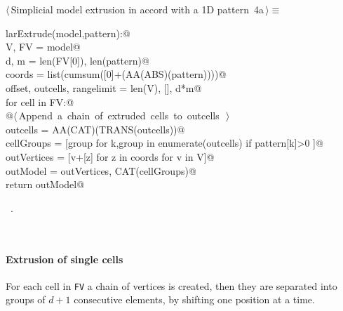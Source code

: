 \documentclass[11pt,oneside]{article}	%
\begin{document}
\begin{flushleft} \small
\begin{minipage}{\linewidth} \label{scrap1}
\protect{}$\langle\,$Simplicial model extrusion in accord with a 1D pattern\nobreak\ {\footnotesize 4a}$\,\rangle\equiv$
\vspace{-1ex}
\begin{list}{}{} \item
\mbox{}\verb@def larExtrude(model,pattern):@\\
\mbox{}\verb@    V, FV = model@\\
\mbox{}\verb@    d, m = len(FV[0]), len(pattern)@\\
\mbox{}\verb@    coords = list(cumsum([0]+(AA(ABS)(pattern))))@\\
\mbox{}\verb@    offset, outcells, rangelimit = len(V), [], d*m@\\
\mbox{}\verb@    for cell in FV:@\\
\mbox{}\verb@        @\hbox{$\langle\,$Append a chain of extruded cells to outcells\nobreak\ {\footnotesize {}}$\,\rangle$}\verb@@\\
\mbox{}\verb@    outcells = AA(CAT)(TRANS(outcells))@\\
\mbox{}\verb@    cellGroups = [group for k,group in enumerate(outcells) if pattern[k]>0 ]@\\
\mbox{}\verb@    outVertices = [v+[z] for z in coords for v in V]@\\
\mbox{}\verb@    outModel = outVertices, CAT(cellGroups)@\\
\mbox{}\verb@    return outModel@\\
\mbox{}\verb@@{\NWsep}
\end{list}
\vspace{-1ex}
\footnotesize\addtolength{\baselineskip}{-1ex}
\begin{list}{}{\setlength{\itemsep}{-\parsep}\setlength{\itemindent}{-\leftmargin}}
\item \NWtxtMacroRefIn\ .
\end{list}
\end{minipage}\\[4ex]
\end{flushleft}

\paragraph{Extrusion of single cells}
For each cell in \texttt{FV} a chain of vertices is created, then they are separated into groups of $d+1$ consecutive elements, by shifting one position at a time.
\end{document}
